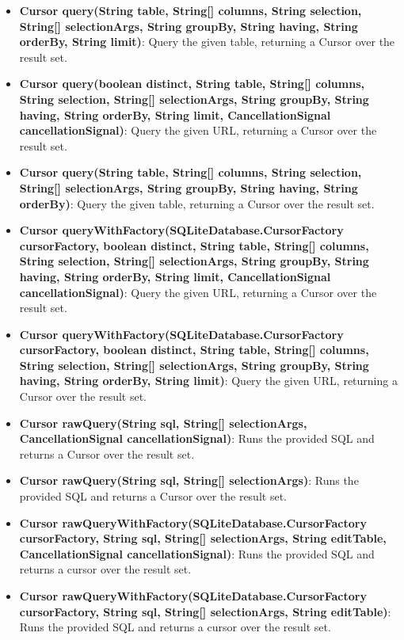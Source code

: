 \documentclass{report}
\begin{document}
\begin{itemize}
\begin{itemize}
\begin{itemize}
                \item \textbf{Cursor	query(String table, String[] columns, String selection, String[] selectionArgs, String groupBy, String having, String orderBy, String limit)}: Query the given table, returning a Cursor over the result set.
                \item \textbf{Cursor	query(boolean distinct, String table, String[] columns, String selection, String[] selectionArgs, String groupBy, String having, String orderBy, String limit, CancellationSignal cancellationSignal)}: Query the given URL, returning a Cursor over the result set.
                \item \textbf{Cursor	query(String table, String[] columns, String selection, String[] selectionArgs, String groupBy, String having, String orderBy)}: Query the given table, returning a Cursor over the result set.
                \item \textbf{Cursor	queryWithFactory(SQLiteDatabase.CursorFactory cursorFactory, boolean distinct, String table, String[] columns, String selection, String[] selectionArgs, String groupBy, String having, String orderBy, String limit, CancellationSignal cancellationSignal)}: Query the given URL, returning a Cursor over the result set.
                \item \textbf{Cursor	queryWithFactory(SQLiteDatabase.CursorFactory cursorFactory, boolean distinct, String table, String[] columns, String selection, String[] selectionArgs, String groupBy, String having, String orderBy, String limit)}: Query the given URL, returning a Cursor over the result set.
                \item \textbf{Cursor	rawQuery(String sql, String[] selectionArgs, CancellationSignal cancellationSignal)}: Runs the provided SQL and returns a Cursor over the result set.
                \item \textbf{Cursor	rawQuery(String sql, String[] selectionArgs)}: Runs the provided SQL and returns a Cursor over the result set.
                \item \textbf{Cursor	rawQueryWithFactory(SQLiteDatabase.CursorFactory cursorFactory, String sql, String[] selectionArgs, String editTable, CancellationSignal cancellationSignal)}: Runs the provided SQL and returns a cursor over the result set.
                \item \textbf{Cursor	rawQueryWithFactory(SQLiteDatabase.CursorFactory cursorFactory, String sql, String[] selectionArgs, String editTable)}: Runs the provided SQL and returns a cursor over the result set.

\end{itemize}
\end{itemize}
\end{itemize}
\end{document}
